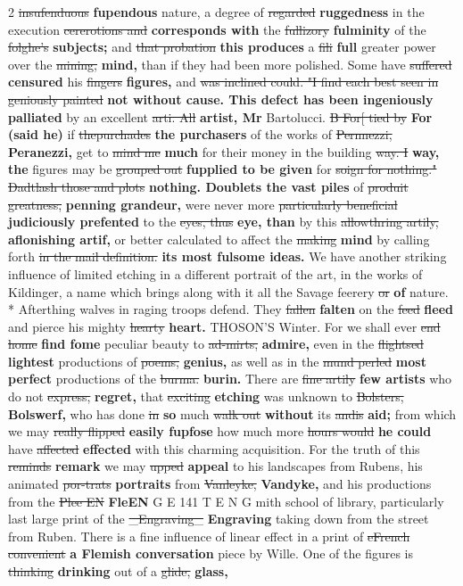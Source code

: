 \documentclass[10pt]{article}
\begin{document}
\begin{multicols}{2}
\sout{insufenduous} \textbf{fupendous} nature, a degree of \sout{regarded} \textbf{ruggedness} in the execution \sout{cererotions and} \textbf{corresponds with} the \sout{fullizory} \textbf{fulminity} of the \sout{folghe's} \textbf{subjects;} and \sout{that probation} \textbf{this produces} a \sout{fili} \textbf{full} greater power over the \sout{mining,} \textbf{mind,} than if they had been more polished. Some have \sout{suffered} \textbf{censured} his \sout{fingers} \textbf{figures,} and \sout{was inclined could. "I find each best seen in geniously painted} \textbf{not without cause. This defect has been ingeniously palliated} by an excellent \sout{arti. All} \textbf{artist, Mr} Bartolucci. \sout{B For[ tied by} \textbf{For (said he)} if \sout{thepurchades} \textbf{the purchasers} of the works of \sout{Pernnezzi,} \textbf{Peranezzi,} get to \sout{mind me} \textbf{much} for their money in the building \sout{way. I} \textbf{way, the} figures may be \sout{grouped out} \textbf{fupplied to be given} for \sout{soign for nothing." Dadtlash those and plots} \textbf{nothing. Doublets the vast piles} of \sout{produit greatness,} \textbf{penning grandeur,} were never more \sout{particularly beneficial} \textbf{judiciously prefented} to the \sout{eyes, thus} \textbf{eye, than} by this \sout{allowthring artily,} \textbf{aflonishing artif,} or better calculated to affect the \sout{making} \textbf{mind} by calling forth \sout{in the mail definition.} \textbf{its most fulsome ideas.} We have another striking influence of limited etching in a different portrait of the art, in the works of Kildinger, a name which brings along with it all the Savage feerery \sout{or} \textbf{of} nature. * Afterthing walves in raging troops defend. They \sout{fallen} \textbf{falten} on the \sout{feed} \textbf{fleed} and pierce his mighty \sout{hearty} \textbf{heart.} THOSON'S Winter. For we shall ever \sout{end home} \textbf{find fome} peculiar beauty to \sout{ad-mirts,} \textbf{admire,} even in the \sout{flightsed} \textbf{lightest} productions of \sout{poems,} \textbf{genius,} as well as in the \sout{mund perled} \textbf{most perfect} productions of the \sout{burma.} \textbf{burin.} There are \sout{fine artily} \textbf{few artists} who do not \sout{express,} \textbf{regret,} that \sout{exciting} \textbf{etching} was unknown to \sout{Bolsters,} \textbf{Bolswerf,} who has done \sout{in} \textbf{so} much \sout{walk out} \textbf{without} its \sout{andis} \textbf{aid;} from which we may \sout{really flipped} \textbf{easily fupfose} how much more \sout{hours would} \textbf{he could} have \sout{affected} \textbf{effected} with this charming acquisition. For the truth of this \sout{reminds} \textbf{remark} we may \sout{upped} \textbf{appeal} to his landscapes from Rubens, his animated \sout{por-trats} \textbf{portraits} from \sout{Vanleyke,} \textbf{Vandyke,} and his productions from the \sout{Plee EN} \textbf{FleEN} G E 141 T E N G mith school of library, particularly last large print of the \sout{\_Engraving\_} \textbf{Engraving} taking down from the street from Ruben. There is a fine influence of linear effect in a print of \sout{eFrench convenient} \textbf{a Flemish conversation} piece by Wille. One of the figures is \sout{thinking} \textbf{drinking} out of a \sout{glide,} \textbf{glass,} 
\end{multicols}
\end{document}
